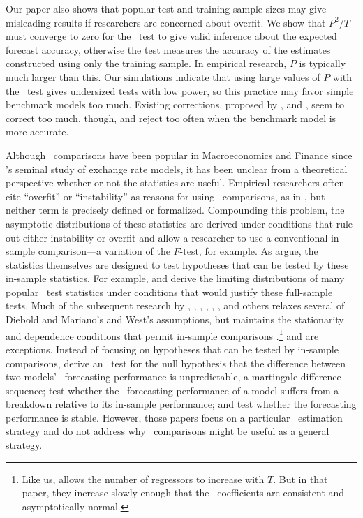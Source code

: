 \documentclass[11pt]{article}
\newcommand{\citepos}[1]{\citeauthor{#1}'s \citeyearpar{#1}}
\begin{document}
Our paper also shows that popular test and training sample sizes may
give misleading results if researchers are concerned about overfit.
We show that $P^2/T$ must converge to zero for the \dmw\ test to give
valid inference about the expected forecast accuracy, otherwise the
test measures the accuracy of the estimates constructed using only the
training sample.  In empirical research, $P$ is typically much larger
than this.  Our simulations indicate that using large values of $P$
with the \dmw\ test gives undersized tests with low power, so this
practice may favor simple benchmark models too much.  Existing
corrections, proposed by \citet{ClM:01,ClM:05}, \citet{Mcc:07} and
\citet{ClW:06,ClW:07}, seem to correct too much, though, and reject
too often when the benchmark model is more accurate.


Although \oos\ comparisons have been popular in Macroeconomics and
Finance since \citepos{MeR:83} seminal study of exchange rate models,
it has been unclear from a theoretical perspective whether or not the
statistics are useful.  Empirical researchers often cite ``overfit''
or ``instability'' as reasons for using \oos\ comparisons, as in
\citet{StW:03}, but neither term is precisely defined or formalized.
Compounding this problem, the asymptotic distributions of these
statistics are derived under conditions that rule out either
instability or overfit and allow a researcher to use a conventional
in-sample comparison---a variation of the $F$-test, for example.  As
\citet{InK:04} argue, the statistics themselves are designed to test
hypotheses that can be tested by these in-sample statistics.  For
example, \citet{DiM:95} and \citet{Wes:96} derive the limiting
distributions of many popular \oos\ test statistics under conditions
that would justify these full-sample tests.  Much
of the subsequent research by \citet{Mcc:00, Mcc:07}, \citet{CCS:01},
\citet{ClM:01,ClM:05}, \citet{CoS:02,CoS:04}, \citet{ClW:06,ClW:07},
\citet{Ana:07}, and others relaxes several of Diebold and Mariano's
and West's assumptions, but maintains the stationarity and dependence
conditions that permit in-sample comparisons \citep[see][for a
review of this literature]{Wes:06}.\footnote{Like us, \citet{Ana:07}
  allows the number of regressors to increase with $T$.  But in that
  paper, they increase slowly enough that the \ols\ coefficients are
  consistent and asymptotically normal.}  \citet{GiW:06} and
\citet{GiR:09, GiR:10} are exceptions.  Instead of focusing on
hypotheses that can be tested by in-sample comparisons, \citet{GiW:06}
derive an \oos\ test for the null hypothesis that the difference
between two models' \oos\ forecasting performance is unpredictable, a
martingale difference sequence; \citet{GiR:09} test whether the \oos\
forecasting performance of a model suffers from a breakdown relative
to its in-sample performance; and \citet{GiR:10} test whether the
forecasting performance is stable. However, those papers focus on a
particular \oos\ estimation strategy and do not address why \oos\
comparisons might be useful as a general strategy.
\end{document}
